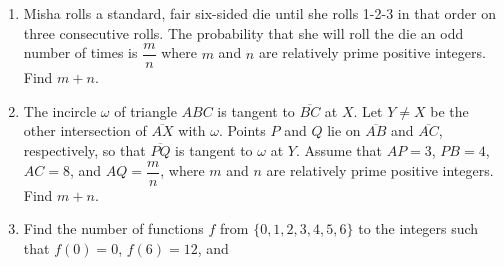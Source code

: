 \documentclass{article}%
\begin{document}
\begin{enumerate}
%
\item%
[\textbf{Problem 13}]Misha rolls a standard, fair six-sided die until she rolls 1-2-3 in that order on three consecutive rolls. The probability that she will roll the die an odd number of times is $\dfrac{m}{n}$ where $m$ and $n$ are relatively prime positive integers. Find $m+n$.
%
\item%
[\textbf{Problem 14}]The incircle $\omega$ of triangle $ABC$ is tangent to $\overline{BC}$ at $X$. Let $Y \neq X$ be the other intersection of $\overline{AX}$ with $\omega$. Points $P$ and $Q$ lie on $\overline{AB}$ and $\overline{AC}$, respectively, so that $\overline{PQ}$ is tangent to $\omega$ at $Y$. Assume that $AP = 3$, $PB = 4$, $AC = 8$, and $AQ = \dfrac{m}{n}$, where $m$ and $n$ are relatively prime positive integers. Find $m+n$.
%
\item%
[\textbf{Problem 15}]Find the number of functions $f$ from $\{0, 1, 2, 3, 4, 5, 6\}$ to the integers such that $f(0) = 0$, $f(6) = 12$, and
%
\end{enumerate}

%
\end{document}
